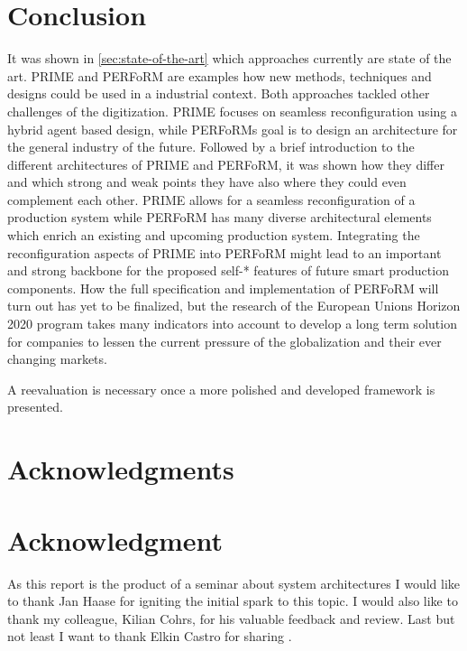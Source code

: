 \documentclass[conference,compsoc,hidelinks]{IEEEtran}
\begin{document}
\section{Conclusion} %
It was shown in \autoref{sec:state-of-the-art} which approaches currently are state of the art. PRIME and PERFoRM are examples how new methods, techniques and designs could be used in a industrial context. Both approaches tackled other challenges of the digitization. PRIME focuses on seamless reconfiguration using a hybrid agent based design, while PERFoRMs goal is to design an architecture for the general industry of the future. Followed by a brief introduction to the different architectures of PRIME and PERFoRM, it was shown how they differ and which strong and weak points they have also where they could even complement each other.
PRIME allows for a seamless reconfiguration of a production system while PERFoRM has many diverse architectural elements which enrich an existing and upcoming production system. Integrating the reconfiguration aspects of PRIME into PERFoRM might lead to an important and strong backbone for the proposed self-* features of future smart production components. How the full specification and implementation of PERFoRM will turn out has yet to be finalized, but the research of the European Unions Horizon 2020 program takes many indicators into account to develop a long term solution for companies to lessen the current pressure of the globalization and their ever changing markets.

A reevaluation is necessary once a more polished and developed framework is presented.

\ifCLASSOPTIONcompsoc
  \section*{Acknowledgments}
\else
  \section*{Acknowledgment}
\fi

As this report is the product of a seminar about system architectures I would like to thank Jan Haase for igniting the initial spark to this topic.
I would also like to thank my colleague, Kilian Cohrs, for his valuable feedback and review. Last but not least I want to thank Elkin Castro for sharing \cite{Agent-Based-Framework}.
\end{document}
